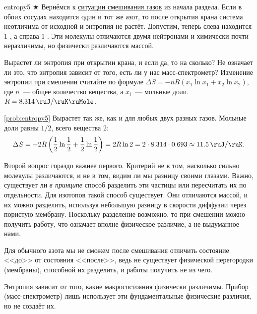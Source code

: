 \begin{problem}{}{entropy5}
    $\bigstar$ Вернёмся к \hyperref[situation_two]{ситуации смешивания газов} из начала раздела. Если в обоих сосудах находится один и тот же азот, то после открытия крана система неотличима от исходной и энтропия не растёт. Допустим, теперь слева находится \qty{1}{\ruMole} , а справа \qty{1}{\ruMole} . Эти молекулы отличаются двумя нейтронами и химически почти неразличимы, но физически различаются массой.

    Вырастет ли энтропия при открытии крана, и если да, то на сколько? Не означает ли это, что энтропия зависит от того, есть ли у нас масс-спектрометр? Изменение энтропии при смешении считайте по формуле $\Delta S = -nR(x_1 \ln x_1 + x_2 \ln x_2)$, где $n$~--- общее количество вещества, а $x_i$~--- мольные доли. $R = \qty{8,314}{\ruJ\per\ruK\ruMole}$.
    \begin{sol}{\ref{prob:entropy5}}
        Вырастет так же, как и для любых двух разных газов. Мольные доли равны $1/2$, всего вещества \qty{2}{\ruMole}:
        \begin{equation*}
            \Delta S = -2R \left( \frac{1}{2} \ln \frac{1}{2} + \frac{1}{2} \ln \frac{1}{2} \right) = 2R \ln 2 = \num{2} \cdot \num{8,314} \cdot \num{0,693} \approx \qty{11,5}{\ruJ\per\ruK}.
        \end{equation*}

        Второй вопрос гораздо важнее первого. Критерий не в том, насколько сильно молекулы различаются, и не в том, видим ли мы разницу своими глазами. Важно, существует ли \emph{в принципе} способ разделить эти частицы или пересчитать их по отдельности. Для изотопов такой способ существует. Они отличаются массой, и их можно разделить, используя небольшую разницу в скорости диффузии через пористую мембрану. Поскольку разделение возможно, то при смешении можно получить работу, что означает вполне физическое различие, а не выдуманное нами.

        Для обычного азота мы не сможем после смешивания отличить состояние <<до>> от состояния <<после>>, ведь не существует физической перегородки (мембраны), способной их разделить, и работы получить не из чего.

        Энтропия зависит от того, какие макросостояния физически различимы. Прибор (масс-спектрометр) лишь использует эти фундаментальные физические различия, но не создаёт их.
    \end{sol}
\end{problem}

